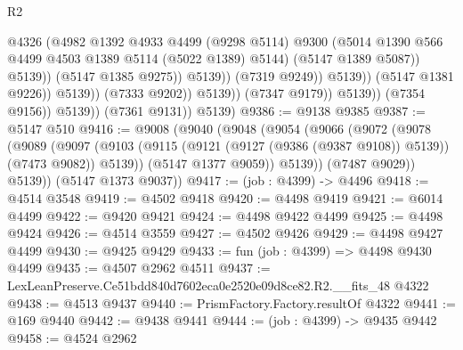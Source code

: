 \begin{lexlean}{R2}
\begin{coremodule}
                                                @4326
                                                (@4982
                                                  @1392
                                                  @4933
                                                  @4499
                                                  (@9298 @5114)
                                                  @9300
                                                  (@5014
                                                    @1390
                                                    @566
                                                    @4499
                                                    @4503
                                                    @1389
                                                    @5114
                                                    (@5022 @1389)
                                                    @5144)
                                                  (@5147 @1389 @5087))
                                                @5139))
                                            (@5147 @1385 @9275))
                                          @5139))
                                      (@7319 @9249))
                                    @5139))
                                (@5147 @1381 @9226))
                              @5139))
                          (@7333 @9202))
                        @5139))
                    (@7347 @9179))
                  @5139))
              (@7354 @9156))
            @5139))
        (@7361 @9131))
      @5139)
@9386 := @9138 @9385
@9387 := @5147 @510
@9416 := @9008
    (@9040
      (@9048
        (@9054
          (@9066
            (@9072
              (@9078
                (@9089
                  (@9097
                    (@9103 (@9115 (@9121 (@9127 (@9386 (@9387 @9108)) @5139)) (@7473 @9082)) @5139))
                  (@5147 @1377 @9059))
                @5139))
            (@7487 @9029))
          @5139))
      (@5147 @1373 @9037))
@9417 := (job : @4399) -> @4496
@9418 := @4514 @3548
@9419 := @4502 @9418
@9420 := @4498 @9419
@9421 := @6014 @4499
@9422 := @9420 @9421
@9424 := @4498 @9422 @4499
@9425 := @4498 @9424
@9426 := @4514 @3559
@9427 := @4502 @9426
@9429 := @4498 @9427 @4499
@9430 := @9425 @9429
@9433 := fun (job : @4399) => @4498 @9430 @4499
@9435 := @4507 @2962 @4511
@9437 := LexLeanPreserve.Ce51bdd840d7602eca0e2520e09d8ce82.R2.__fits_48 @4322
@9438 := @4513 @9437
@9440 := PrismFactory.Factory.resultOf @4322
@9441 := @169 @9440
@9442 := @9438 @9441
@9444 := (job : @4399) -> @9435 @9442
@9458 := @4524
    @2962

\end{coremodule}
\end{lexlean}
